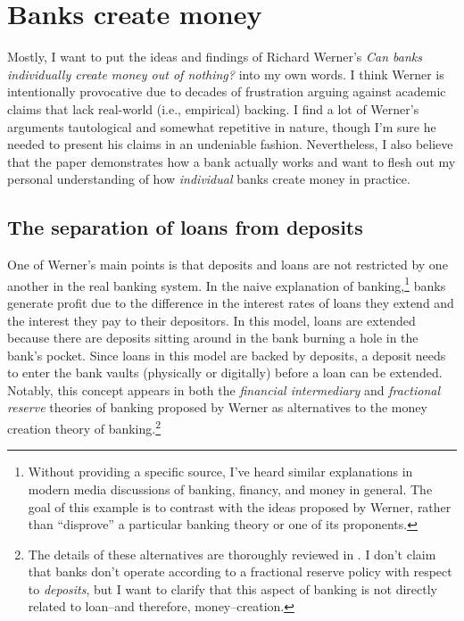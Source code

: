 \section{Banks create money}

Mostly, I want to put the ideas and findings of Richard Werner's {\it Can banks individually create money out of nothing?} \cite{Werner2014} into my own words.  I think  Werner is intentionally provocative due to decades of frustration arguing against academic claims that lack real-world (i.e., empirical) backing.  I find a lot of Werner's arguments tautological and somewhat repetitive in nature, though I'm sure he needed to present his claims in an undeniable fashion.  Nevertheless, I also believe that the paper demonstrates how a bank actually works and want to flesh out my personal understanding of how {\it individual} banks create money in practice.


\subsection{The separation of loans from deposits}

One of Werner's main points is that deposits and loans are not restricted by one another in the real banking system.  In the naive explanation of banking,\footnote{Without providing a specific source, I've heard similar explanations in modern media discussions of banking, financy, and money in general.  The goal of this example is to contrast with the ideas proposed by Werner, rather than ``disprove'' a particular banking theory or one of its proponents.} banks generate profit due to the difference in the interest rates of loans they extend and the interest they pay to their depositors.  In this model, loans are extended because there are deposits sitting around in the bank burning a hole in the bank's pocket.  Since loans in this model are backed by deposits, a deposit needs to enter the bank vaults (physically or digitally) before a loan can be extended.  Notably, this concept appears in both the {\it financial intermediary} and {\it fractional reserve} theories of banking proposed by Werner as alternatives to the money creation theory of banking.\footnote{The details of these alternatives are thoroughly reviewed in \cite{Werner2014}.  I don't claim that banks don't operate according to a fractional reserve policy with respect to {\it deposits}, but I want to clarify that this aspect of banking is not directly related to loan--and therefore, money--creation.}  

